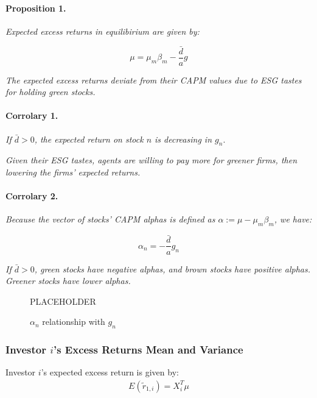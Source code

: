 \paragraph{Proposition 1.}
\textit{Expected excess returns in equilibirium are given by:}

\begin{equation}
    \mu = \mu_m \beta_m - \frac{\bar{d}}{a} g 
\end{equation}

\textit{
The expected excess returns deviate from their CAPM values due to ESG 
tastes for holding green stocks.}

\paragraph{Corrolary 1.}
\textit{If $\bar{d} > 0$, the expected return on stock $n$ is decreasing in $g_n$}.

\textit{Given their ESG tastes, agents are willing to pay more for greener firms, then 
lowering the firms' expected returns.}

\paragraph{Corrolary 2.} \textit{Because the vector of stocks' CAPM alphas is defined as 
$\alpha := \mu - \mu_m \beta_m$, we have:}

\begin{equation}
    \alpha_n = - \frac{\bar{d}}{a} g_n
\end{equation}

\textit{If $\bar{d} > 0$, green stocks have negative alphas, and brown stocks 
have positive alphas. Greener stocks have lower alphas.}


\begin{figure}
    \centering
    PLACEHOLDER
    \caption{$\alpha_n$ relationship with $g_n$}
    \label{fig:esg_returns}
\end{figure}

\subsubsection{Investor $i$'s Excess Returns Mean and Variance}

Investor $i$'s expected excess return is given by:
\begin{equation}
    \begin{aligned}
E(\tilde{r}_{1,i}) = X_i^T \mu \\ 
    \end{aligned}
\end{equation}


